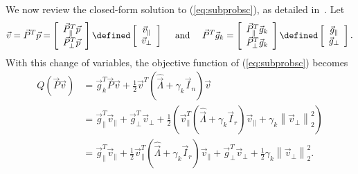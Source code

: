 {We now review the closed-form solution to (\ref{eq:subprobsc}), as detailed 
in~\cite{BurdakovLMTR16}.  Let 
\begin{equation}\label{eqn-varchange}
  \vec{v} = \vec{P}^T\vec{p} = 	\left[ 
										\begin{array}{c}
                                                                                  \vec{P}^T_{\parallel}\vec{p} \\
                                                                                  \vec{P}^T_{\perp}\vec{p} 
										\end{array}
                                                                              \right]
                                                                              \defined 	\left[ 
										\begin{array}{c}
											\vec{v}_{\parallel} \\
											\vec{v}_{\perp} 
										\end{array}
									\right] \quad \text{ and } \quad
				\vec{P}^T\vec{g}_k = 	\left[ 
										\begin{array}{c}
											\vec{P}^T_{\parallel}\vec{g}_k \\
											\vec{P}^T_{\perp}\vec{g}_k 
										\end{array}
									\right]
								\defined 	\left[ 
										\begin{array}{c}
											\vec{g}_{\parallel} \\
											\vec{g}_{\perp} 
										\end{array}
									\right].
\end{equation}
With this change of variables, the objective function of (\ref{eq:subprobsc})
becomes
\begin{align*}
	Q\left( \vec{P}\vec{v} \right) &= \vec{g}^T_k \vec{P}\vec{v} + \frac{1}{2} \vec{v}^T \left(  \hat{\vec{\Lambda}}+\gamma_k \vec{I}_n   \right) \vec{v}  \\
							&= \vec{g}^T_{\parallel} \vec{v}_{\parallel} + \vec{g}^T_{\perp} \vec{v}_{\perp} +
									\frac{1}{2}\left( \vec{v}^T_{\parallel} \left( \hat{\vec{\Lambda}} + \gamma_k \vec{I}_r  \right) \vec{v}_{\parallel} + 
										\gamma_k\left\| \vec{v}_{\perp} \right\|^2_2  \right) \\
							&= \vec{g}^T_{\parallel} \vec{v}_{\parallel}+\frac{1}{2} \vec{v}^T_{\parallel} \left( 
\hat{\vec{\Lambda}} + \gamma_k \vec{I}_r\right) \vec{v}_{\parallel} + \vec{g}^T_{\perp} \vec{v}_{\perp} + \frac{1}{2}\gamma_k\left\| \vec{v}_{\perp} \right\|^2_2.

\end{align*}}
